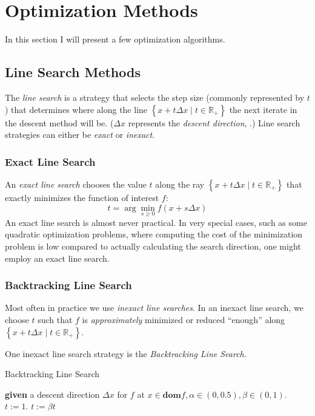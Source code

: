 \section{Optimization Methods}

In this section I will present a few optimization algorithms.

\subsection{Line Search Methods}

The \textit{line search} is a strategy that selects the step size (commonly represented by $t$) that determines where along the line $\left\lbrace x+t\Delta x\mid t\in\mathbb{R}_+\right\rbrace$ the next iterate in the descent method will be. ($\Delta x$ represents the \textit{descent direction}, .) Line search strategies can either be \textit{exact} or \textit{inexact}.

\subsubsection*{Exact Line Search}

An \textit{exact line search} chooses the value $t$ along the ray $\left\lbrace x+t\Delta x\mid t\in\mathbb{R}_+\right\rbrace$ that exactly minimizes the function of interest $f$:
$$t=\arg\min_{s\geq 0}f(x+s\Delta x)$$
An exact line search is almost never practical. In very special cases, such as some quadratic optimization problems, where computing the cost of the minimization problem is low compared to actually calculating the search direction, one might employ an exact line search.

\subsubsection*{Backtracking Line Search}
Most often in practice we use \textit{inexact line searches}. In an inexact line search, we choose $t$ such that $f$ is \textit{approximately} minimized or reduced ``enough'' along $\left\lbrace x+t\Delta x\mid t\in\mathbb{R}_+\right\rbrace$.

One inexact line search strategy is the \textit{Backtracking Line Search}.
\begin{algorithm}[H]
	\caption{Backtracking Line Search \cite[]{Boyd2004}\label{BacktrackingLineSearchAlg}}
	\begin{algorithmic} 
		\State \textbf{given} a descent direction $\Delta x$ for $f$ at $x\in\textbf{dom}f,\alpha\in(0,0.5),\beta\in(0,1)$.
		\State $t:=1$.
		\State $t:=\beta t$
		\EndWhile
	\end{algorithmic}
\end{algorithm}

